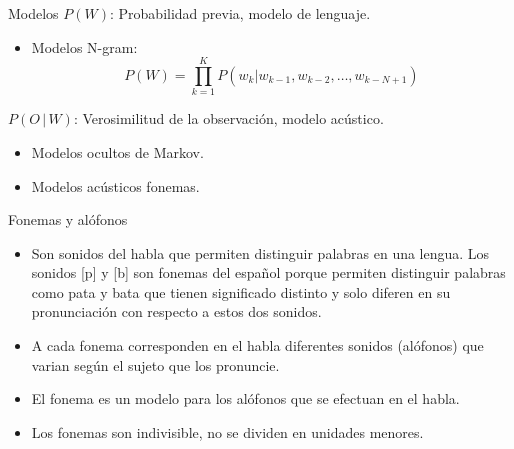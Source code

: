 \documentclass[11pt,xcolor={dvipsnames}]{beamer}
\begin{document}
\begin{frame}{Modelos}
$P(W)$: Probabilidad previa, modelo de lenguaje.
\begin{itemize}
\item Modelos N-gram:
$$P(W)= \prod_{k=1}^K P (w_k |w_{k-1} , w_{k-2} , \ldots , w_{k-N +1})$$
\end{itemize}
$P(O\,|\,W)$: Verosimilitud de la observación, modelo acústico.
\begin{itemize}
\item Modelos ocultos de Markov.
\item Modelos acústicos fonemas.
\end{itemize}
\end{frame}

\begin{frame}{Fonemas y alófonos}
\begin{itemize}
\item Son sonidos del habla que permiten distinguir palabras en una lengua. Los sonidos [p] y [b] son fonemas del español porque permiten distinguir palabras como pata y bata que tienen significado distinto y solo diferen en su pronunciación con respecto a estos dos sonidos.
\item A cada fonema corresponden en el habla diferentes sonidos (alófonos) que varian según el sujeto que los pronuncie. 
\item El fonema es un modelo para los alófonos que se efectuan en el habla.
\item Los fonemas son indivisible, no se dividen en unidades menores. 
\end{itemize}
\end{frame}
\end{document}

